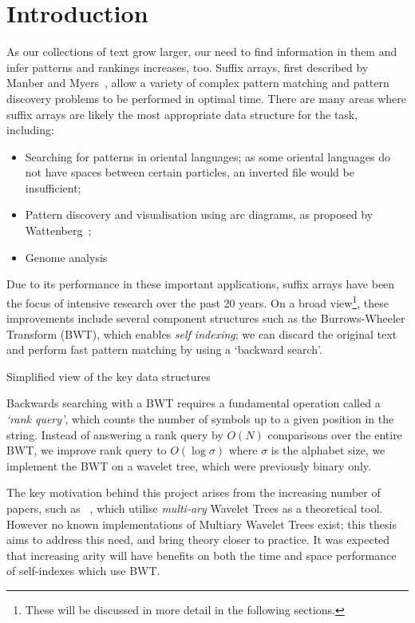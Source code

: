 \section{Introduction}

As our collections of text grow larger, our need to find information in them
and infer patterns and rankings increases, too. Suffix arrays, first
described by Manber and Myers~\cite{manber1990}, allow a variety of complex 
pattern matching and pattern discovery problems to be performed in optimal time. 
There are many areas where suffix arrays are likely the most appropriate data 
structure for the task, including:

\begin{itemize}
\item
	Searching for patterns in oriental languages; as some oriental languages
    do not have spaces between certain particles, an inverted file would be
    insufficient;
\item
	Pattern discovery and visualisation using arc diagrams, as proposed by
    Wattenberg~\cite{arc:wattenberg2002};
\item
	Genome analysis~\cite{genome:abouelhoda2004, genome:flicek2009}
\end{itemize}

Due to its performance in these important applications, suffix arrays have been
the focus of intensive research over the past 20 years. On a broad
view\footnote{These will be discussed in more detail in the following 
sections.}, these improvements include several component structures such as the 
Burrows-Wheeler Transform (BWT), which enables \emph{self indexing}; we can 
discard the original text and perform fast pattern matching by using a `backward 
search'.

			{Simplified view of the key data structures}

Backwards searching with a BWT requires a fundamental operation called a 
\emph{`rank query'}, which counts the number of symbols up to a given position in the 
string. Instead of answering a rank query by $O(N)$ comparisons over the
entire BWT, we improve rank query to $O(\log \sigma)$ where $\sigma$ 
is the alphabet size, we implement the BWT on a wavelet tree, which were 
previously binary only. 

The key motivation behind this project arises from the increasing number of
papers, such as ~\cite{yu2009}, which utilise \emph{multi-ary} Wavelet
Trees as a theoretical tool. However no known implementations of Multiary 
Wavelet Trees exist; this thesis aims to address this need, and bring theory 
closer to practice. It was expected that increasing arity will have benefits
on both the time and space performance of self-indexes which use BWT.

